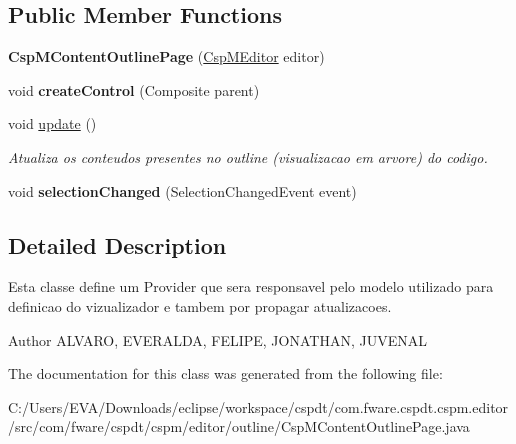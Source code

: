 \subsection*{Public Member Functions}
\begin{DoxyCompactItemize}
\item 
\mbox{\label{classcom_1_1fware_1_1cspdt_1_1cspm_1_1editor_1_1outline_1_1_csp_m_content_outline_page_a622590ace44395865a598018712277c8}} 
{\bfseries Csp\+M\+Content\+Outline\+Page} (\hyperlink{classcom_1_1fware_1_1cspdt_1_1cspm_1_1editor_1_1_csp_m_editor}{Csp\+M\+Editor} editor)
\item 
\mbox{\label{classcom_1_1fware_1_1cspdt_1_1cspm_1_1editor_1_1outline_1_1_csp_m_content_outline_page_a7ec8442437eee846f3f1702a48f643b5}} 
void {\bfseries create\+Control} (Composite parent)
\item 
\mbox{\label{classcom_1_1fware_1_1cspdt_1_1cspm_1_1editor_1_1outline_1_1_csp_m_content_outline_page_a5e59e01dba3fe612f448e3ef339ade05}} 
void \hyperlink{classcom_1_1fware_1_1cspdt_1_1cspm_1_1editor_1_1outline_1_1_csp_m_content_outline_page_a5e59e01dba3fe612f448e3ef339ade05}{update} ()
\begin{DoxyCompactList}\small\item\em Atualiza os conteudos presentes no outline (visualizacao em arvore) do codigo. \end{DoxyCompactList}\item 
\mbox{\label{classcom_1_1fware_1_1cspdt_1_1cspm_1_1editor_1_1outline_1_1_csp_m_content_outline_page_af2a79367ca388e41f532ec28b74648cb}} 
void {\bfseries selection\+Changed} (Selection\+Changed\+Event event)
\end{DoxyCompactItemize}


\subsection{Detailed Description}
Esta classe define um Provider que sera responsavel pelo modelo utilizado para definicao do vizualizador e tambem por propagar atualizacoes. 

\begin{DoxyAuthor}{Author}
A\+L\+V\+A\+RO, E\+V\+E\+R\+A\+L\+DA, F\+E\+L\+I\+PE, J\+O\+N\+A\+T\+H\+AN, J\+U\+V\+E\+N\+AL 
\end{DoxyAuthor}


The documentation for this class was generated from the following file\+:\begin{DoxyCompactItemize}
\item 
C\+:/\+Users/\+E\+V\+A/\+Downloads/eclipse/workspace/cspdt/com.\+fware.\+cspdt.\+cspm.\+editor/src/com/fware/cspdt/cspm/editor/outline/Csp\+M\+Content\+Outline\+Page.\+java\end{DoxyCompactItemize}
